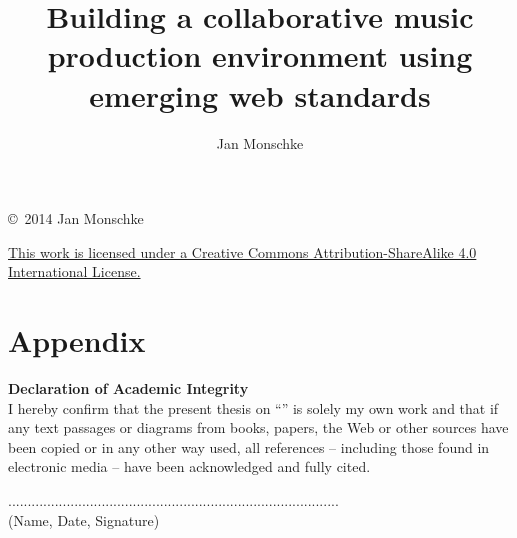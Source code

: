\author{Jan Monschke}
\title{Building a collaborative music production environment using emerging web standards}








\thispagestyle{empty}
\phantom{a}
\vfill

\noindent \copyright \ 2014 Jan Monschke

\noindent \href{http://creativecommons.org/licenses/by-sa/4.0/}{This work is licensed under a Creative Commons Attribution-ShareAlike 4.0 International License.}

\vfill









\newpage
\listoffigures
\newpage
\lstlistoflistings




\part{Appendix}
\begin{appendix}
   \clearpage
   
\end{appendix}

\newpage
\thispagestyle{empty}

\noindent \textbf{Declaration of Academic Integrity}\\


\noindent I hereby confirm that the present thesis on ``\thesistitle'' is solely my own work and that if any text passages or diagrams from books, papers, the Web or other sources have been copied or in any other way used, all references – including those found in electronic media – have been acknowledged and fully cited.

\vspace*{1.5cm}
\noindent .....................................................................................\\
(Name, Date, Signature)

